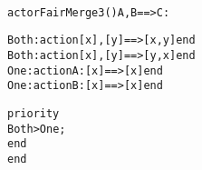 \begin{example}\ 
\begin{alltt}
actor FairMerge3 () A, B ==> C :

  Both: action [x], [y] ==> [x, y] end
  Both: action [x], [y] ==> [y, x] end
  One:  action A: [x] ==> [x] end
  One:  action B: [x] ==> [x] end

  priority
    Both > One;
  end
end
\end{alltt}
\end{example}
























